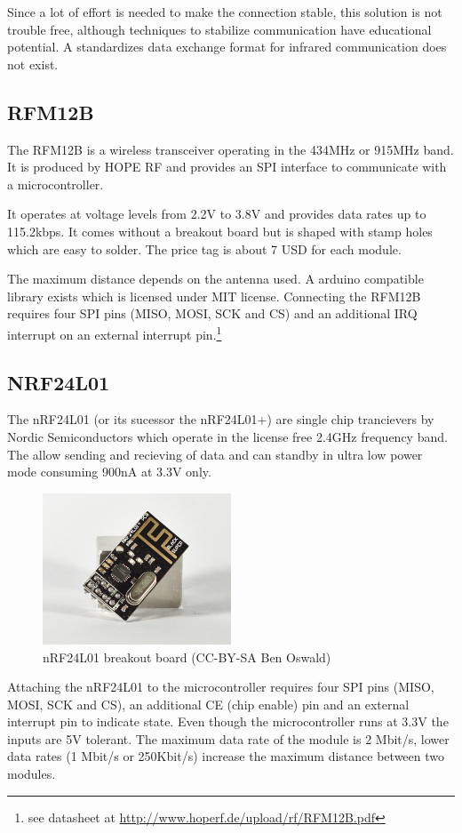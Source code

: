 Since a lot of effort is needed to make the connection stable, this solution is not trouble free, although techniques to stabilize communication have educational potential. A standardizes data exchange format for infrared communication does not exist.

\subsection{RFM12B}
The RFM12B is a wireless transceiver operating in the 434MHz or 915MHz band. It is produced by HOPE RF and provides an SPI interface to communicate with a microcontroller. 

It operates at voltage levels from 2.2V to 3.8V and provides data rates up to 115.2kbps. It comes without a breakout board but is shaped with stamp holes which are easy to solder. The price tag is about 7 USD for each module.

The maximum distance depends on the antenna used. A arduino compatible library exists which is licensed under MIT license. Connecting the RFM12B requires four SPI pins (MISO, MOSI, SCK and CS) and an additional IRQ interrupt on an external interrupt pin.\footnote{see datasheet at \url{http://www.hoperf.de/upload/rf/RFM12B.pdf}}
\subsection{NRF24L01}
The nRF24L01 (or its sucessor the nRF24L01+) are single chip trancievers by Nordic Semiconductors which operate in the license free 2.4GHz frequency band. The allow sending and recieving of data and can standby in ultra low power mode consuming 900nA at 3.3V only.

\begin{figure}[H]
  \centering
  \includegraphics[width=0.5\textwidth]{images/30_nrf24l01.jpg}
  \caption{nRF24L01 breakout board (CC-BY-SA Ben Oswald)}
\end{figure}

Attaching the nRF24L01 to the microcontroller requires four SPI pins (MISO, MOSI, SCK and CS), an additional CE (chip enable) pin and an external interrupt pin to indicate state. Even though the microcontroller runs at 3.3V the inputs are 5V tolerant. The maximum data rate of the module is 2 Mbit/s, lower data rates (1 Mbit/s or 250Kbit/s) increase the maximum distance between two modules.

